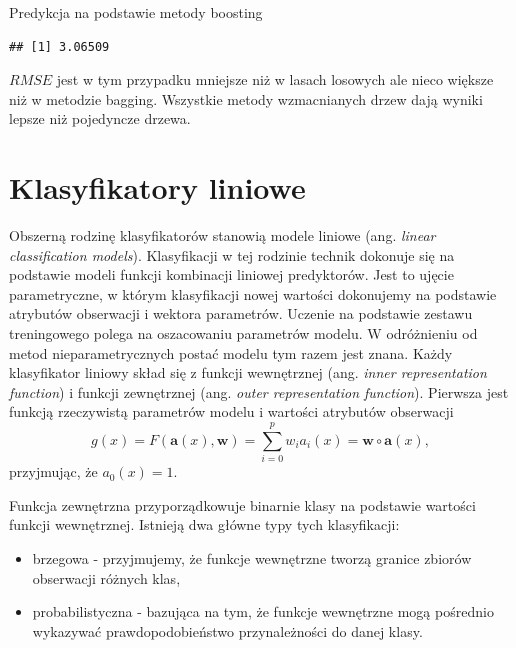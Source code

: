 \documentclass[]{book}
\newenvironment{Shaded}{\begin{snugshade}}{\end{snugshade}}
\newcommand{\DataTypeTok}[1]{\textcolor[rgb]{0.13,0.29,0.53}{#1}}
\newcommand{\DecValTok}[1]{\textcolor[rgb]{0.00,0.00,0.81}{#1}}
\newcommand{\KeywordTok}[1]{\textcolor[rgb]{0.13,0.29,0.53}{\textbf{#1}}}
\newcommand{\NormalTok}[1]{#1}
\newcommand{\OperatorTok}[1]{\textcolor[rgb]{0.81,0.36,0.00}{\textbf{#1}}}
\newcommand{\StringTok}[1]{\textcolor[rgb]{0.31,0.60,0.02}{#1}}
\providecommand{\tightlist}{%
  \setlength{\itemsep}{0pt}\setlength{\parskip}{0pt}}
\theoremstyle{plain}
\theoremstyle{definition}
\theoremstyle{definition}
\theoremstyle{definition}
\theoremstyle{definition}
\theoremstyle{remark}
\begin{document}
Predykcja na podstawie metody boosting

\begin{Shaded}
\end{Shaded}

\begin{verbatim}
## [1] 3.06509
\end{verbatim}

\(RMSE\) jest w tym przypadku mniejsze niż w lasach losowych ale nieco większe niż w metodzie bagging. Wszystkie metody wzmacnianych drzew dają wyniki lepsze niż pojedyncze drzewa.

\hypertarget{klasyfikatory-liniowe}{%
\chapter{Klasyfikatory liniowe}\label{klasyfikatory-liniowe}}

Obszerną rodzinę klasyfikatorów stanowią modele liniowe (ang. \emph{linear classification models}). Klasyfikacji w tej rodzinie technik dokonuje się na podstawie modeli funkcji kombinacji liniowej predyktorów. Jest to ujęcie parametryczne, w którym klasyfikacji nowej wartości dokonujemy na podstawie atrybutów obserwacji i wektora parametrów. Uczenie na podstawie zestawu treningowego polega na oszacowaniu parametrów modelu. W odróżnieniu od metod nieparametrycznych postać modelu tym razem jest znana. Każdy klasyfikator liniowy skład się z funkcji wewnętrznej (ang. \emph{inner representation function}) i funkcji zewnętrznej (ang. \emph{outer representation function}).
Pierwsza jest funkcją rzeczywistą parametrów modelu i wartości atrybutów obserwacji
\begin{equation}
    g(x) = F(\mathbf{a}(x),\mathbf{w})=\sum_{i=0}^pw_ia_i(x)=\mathbf{w}\circ \mathbf{a}(x),
\end{equation}
przyjmując, że \(a_0(x)=1\).

Funkcja zewnętrzna przyporządkowuje binarnie klasy na podstawie wartości funkcji wewnętrznej. Istnieją dwa główne typy tych klasyfikacji:

\begin{itemize}
\tightlist
\item
  brzegowa - przyjmujemy, że funkcje wewnętrzne tworzą granice zbiorów obserwacji różnych klas,
\item
  probabilistyczna - bazująca na tym, że funkcje wewnętrzne mogą pośrednio wykazywać prawdopodobieństwo przynależności do danej klasy.
\end{itemize}
\end{document}
